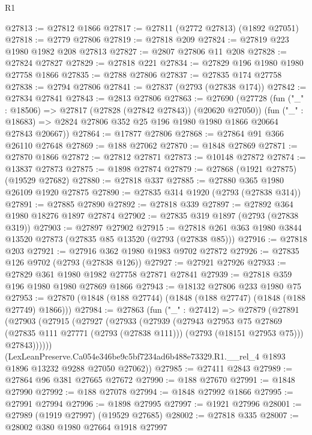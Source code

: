 \begin{lexlean}{R1}
\begin{coremodule}
@27813 := @27812 @1866
@27817 := @27811 (@2772 @27813) (@1892 @27051)
@27818 := @2779 @27806
@27819 := @27818 @209
@27824 := @27819 @223 @1980 @1982 @208 @27813
@27827 := @2807 @27806 @11 @208
@27828 := @27824 @27827
@27829 := @27818 @221
@27834 := @27829 @196 @1980 @1980 @27758 @1866
@27835 := @2788 @27806
@27837 := @27835 @174 @27758
@27838 := @2794 @27806
@27841 := @27837 (@2793 (@27838 @174))
@27842 := @27834 @27841
@27843 := @2813 @27806
@27863 := @27690
    (@27728
      (fun ("_" : @18506) => @27817 (@27828 (@27842 @27843)) (@20620 @27050))
      (fun ("_" : @18683) => @2824 @27806 @352 @25 @196 @1980 @1980 @1866 @20664 @27843 @20667))
@27864 := @17877 @27806
@27868 := @27864 @91 @366 @26110 @27648
@27869 := @188 @27062
@27870 := @1848 @27869
@27871 := @27870 @1866
@27872 := @27812 @27871
@27873 := @10148 @27872
@27874 := @13837 @27873
@27875 := @1898 @27874
@27879 := @27868 (@1921 @27875) (@19529 @27682)
@27880 := @27818 @337
@27885 := @27880 @365 @1980 @26109 @1920 @27875
@27890 := @27835 @314 @1920 (@2793 (@27838 @314))
@27891 := @27885 @27890
@27892 := @27818 @339
@27897 := @27892 @364 @1980 @18276 @1897 @27874
@27902 := @27835 @319 @1897 (@2793 (@27838 @319))
@27903 := @27897 @27902
@27915 := @27818 @261 @363 @1980 @3844 @13520 @27873 (@27835 @85 @13520 (@2793 (@27838 @85)))
@27916 := @27818 @203
@27921 := @27916 @362 @1980 @1983 @9702 @27872
@27926 := @27835 @126 @9702 (@2793 (@27838 @126))
@27927 := @27921 @27926
@27933 := @27829 @361 @1980 @1982 @27758 @27871 @27841
@27939 := @27818 @359 @196 @1980 @1980 @27869 @1866
@27943 := @18132 @27806 @233 @1980 @75
@27953 := @27870 (@1848 (@188 @27744) (@1848 (@188 @27747) (@1848 (@188 @27749) @1866)))
@27984 := @27863
    (fun ("_" : @27412) =>
    @27879
      (@27891
        (@27903
          (@27915
            (@27927
              (@27933
                (@27939
                  (@27943
                    @27953
                    @75
                    @27869
                    (@27835 @111 @27771 (@2793 (@27838 @111)))
                    (@2793 (@18151 @27953 @75)))
                  @27843))))))
      (LexLeanPreserve.Ca054e346be9c5bf7234ad6b488e73329.R1.__rel_4
        @1893
        @1896
        @13232
        @9288
        @27050
        @27062))
@27985 := @27411 @2843
@27989 := @27864 @96 @381 @27665 @27672
@27990 := @188 @27670
@27991 := @1848 @27990
@27992 := @188 @27078
@27994 := @1848 @27992 @1866
@27995 := @27991 @27994
@27996 := @1898 @27995
@27997 := @1921 @27996
@28001 := @27989 (@1919 @27997) (@19529 @27685)
@28002 := @27818 @335
@28007 := @28002 @380 @1980 @27664 @1918 @27997

\end{coremodule}
\end{lexlean}

